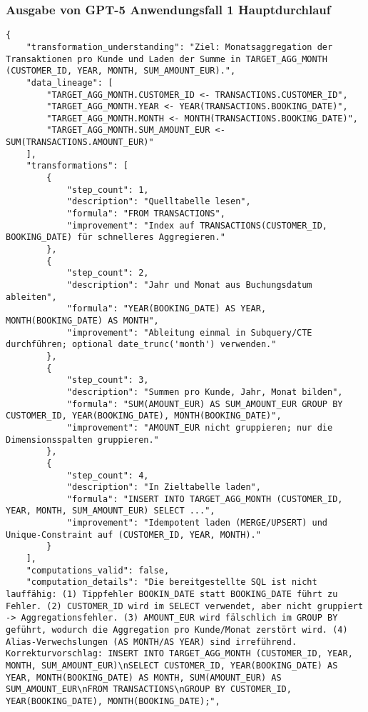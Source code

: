 \subsubsection{Ausgabe von GPT-5 Anwendungsfall 1 Hauptdurchlauf}\label{anhang:subsubsec:gpt_case1_prompt1}
\begin{lstlisting}[caption={Ausgabe: GPT-5 Anwendungsfall 1 Hauptdurchlauf},label={gpt_case1_prompt1}]
{
    "transformation_understanding": "Ziel: Monatsaggregation der Transaktionen pro Kunde und Laden der Summe in TARGET_AGG_MONTH (CUSTOMER_ID, YEAR, MONTH, SUM_AMOUNT_EUR).",
    "data_lineage": [
        "TARGET_AGG_MONTH.CUSTOMER_ID <- TRANSACTIONS.CUSTOMER_ID",
        "TARGET_AGG_MONTH.YEAR <- YEAR(TRANSACTIONS.BOOKING_DATE)",
        "TARGET_AGG_MONTH.MONTH <- MONTH(TRANSACTIONS.BOOKING_DATE)",
        "TARGET_AGG_MONTH.SUM_AMOUNT_EUR <- SUM(TRANSACTIONS.AMOUNT_EUR)"
    ],
    "transformations": [
        {
            "step_count": 1,
            "description": "Quelltabelle lesen",
            "formula": "FROM TRANSACTIONS",
            "improvement": "Index auf TRANSACTIONS(CUSTOMER_ID, BOOKING_DATE) für schnelleres Aggregieren."
        },
        {
            "step_count": 2,
            "description": "Jahr und Monat aus Buchungsdatum ableiten",
            "formula": "YEAR(BOOKING_DATE) AS YEAR, MONTH(BOOKING_DATE) AS MONTH",
            "improvement": "Ableitung einmal in Subquery/CTE durchführen; optional date_trunc('month') verwenden."
        },
        {
            "step_count": 3,
            "description": "Summen pro Kunde, Jahr, Monat bilden",
            "formula": "SUM(AMOUNT_EUR) AS SUM_AMOUNT_EUR GROUP BY CUSTOMER_ID, YEAR(BOOKING_DATE), MONTH(BOOKING_DATE)",
            "improvement": "AMOUNT_EUR nicht gruppieren; nur die Dimensionsspalten gruppieren."
        },
        {
            "step_count": 4,
            "description": "In Zieltabelle laden",
            "formula": "INSERT INTO TARGET_AGG_MONTH (CUSTOMER_ID, YEAR, MONTH, SUM_AMOUNT_EUR) SELECT ...",
            "improvement": "Idempotent laden (MERGE/UPSERT) und Unique-Constraint auf (CUSTOMER_ID, YEAR, MONTH)."
        }
    ],
    "computations_valid": false,
    "computation_details": "Die bereitgestellte SQL ist nicht lauffähig: (1) Tippfehler BOOKIN_DATE statt BOOKING_DATE führt zu Fehler. (2) CUSTOMER_ID wird im SELECT verwendet, aber nicht gruppiert -> Aggregationsfehler. (3) AMOUNT_EUR wird fälschlich im GROUP BY geführt, wodurch die Aggregation pro Kunde/Monat zerstört wird. (4) Alias-Verwechslungen (AS MONTH/AS YEAR) sind irreführend. Korrekturvorschlag: INSERT INTO TARGET_AGG_MONTH (CUSTOMER_ID, YEAR, MONTH, SUM_AMOUNT_EUR)\nSELECT CUSTOMER_ID, YEAR(BOOKING_DATE) AS YEAR, MONTH(BOOKING_DATE) AS MONTH, SUM(AMOUNT_EUR) AS SUM_AMOUNT_EUR\nFROM TRANSACTIONS\nGROUP BY CUSTOMER_ID, YEAR(BOOKING_DATE), MONTH(BOOKING_DATE);",

\end{lstlisting}
